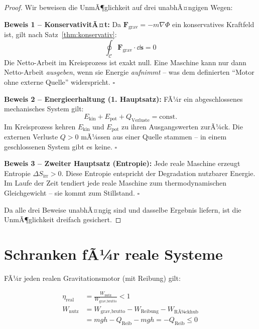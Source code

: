 ﻿\documentclass[12pt, a4paper]{report}
\theoremstyle{definition}
\theoremstyle{remark}
\newcommand{\vek}[1]{\boldsymbol{#1}}
\begin{document}
\begin{proof}
  Wir beweisen die UnmÃ¶glichkeit auf drei unabhÃ¤ngigen Wegen:

  \textbf{Beweis 1 -- KonservativitÃ¤t:}
  Da $\vek{F}_{\text{grav}} = -m\nabla\Phi$ ein konservatives Kraftfeld ist, gilt
  nach Satz~\ref{thm:konservativ}:
  \begin{equation}
    \oint_{\mathcal{C}} \vek{F}_{\text{grav}} \cdot \dd\vek{s} = 0
  \end{equation}
  Die Netto-Arbeit im Kreisprozess ist exakt null. Eine Maschine kann nur dann
  Netto-Arbeit \emph{ausgeben}, wenn sie Energie \emph{aufnimmt} -- was dem
  definierten ``Motor ohne externe Quelle'' widerspricht. $\square$

  \textbf{Beweis 2 -- Energieerhaltung (1. Hauptsatz):}
  FÃ¼r ein abgeschlossenes mechanisches System gilt:
  \begin{equation}
    E_{\text{kin}} + E_{\text{pot}} + Q_{\text{Verluste}} = \text{const.}
  \end{equation}
  Im Kreisprozess kehren $E_{\text{kin}}$ und $E_{\text{pot}}$ zu ihren
  Ausgangswerten zurÃ¼ck. Die externen Verluste $Q > 0$ mÃ¼ssen aus einer
  Quelle stammen -- in einem geschlossenen System gibt es keine. $\square$

  \textbf{Beweis 3 -- Zweiter Hauptsatz (Entropie):}
  Jede reale Maschine erzeugt Entropie $\Delta S_{\text{irr}} > 0$. Diese
  Entropie entspricht der Degradation nutzbarer Energie. Im Laufe der Zeit
  tendiert jede reale Maschine zum thermodynamischen Gleichgewicht --
  sie kommt zum Stillstand. $\square$

  Da alle drei Beweise unabhÃ¤ngig sind und dasselbe Ergebnis liefern, ist
  die UnmÃ¶glichkeit dreifach gesichert.
\end{proof}

\section{Schranken fÃ¼r reale Systeme}

FÃ¼r jeden realen Gravitationsmotor (mit Reibung) gilt:

\begin{align}
  \eta_{\text{real}} &= \frac{W_{\text{nutz}}}{W_{\text{grav,brutto}}} < 1 \label{eq:eta_real}\\
  W_{\text{nutz}} &= W_{\text{grav,brutto}} - W_{\text{Reibung}} - W_{\text{RÃ¼ckhub}} \label{eq:nutzarbeit}\\
  &= mgh - Q_{\text{Reib}} - mgh = -Q_{\text{Reib}} \leq 0 \label{eq:nutzarbeit2}
\end{align}
\end{document}
